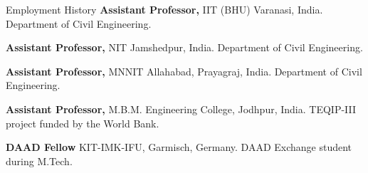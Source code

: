 \begin{rubric}{Employment History}
    \textbf{Assistant Professor,} IIT (BHU) Varanasi, India. Department of Civil Engineering.
    
    \textbf{Assistant Professor,} NIT Jamshedpur, India. Department of Civil Engineering.
    
    \textbf{Assistant Professor,} MNNIT Allahabad, Prayagraj, India. Department of Civil Engineering.
    
    \textbf{Assistant Professor,} M.B.M. Engineering College, Jodhpur, India. TEQIP-III project funded by the World Bank.
    
    \textbf{DAAD Fellow} KIT-IMK-IFU, Garmisch, Germany. DAAD Exchange student during M.Tech.
\end{rubric}
